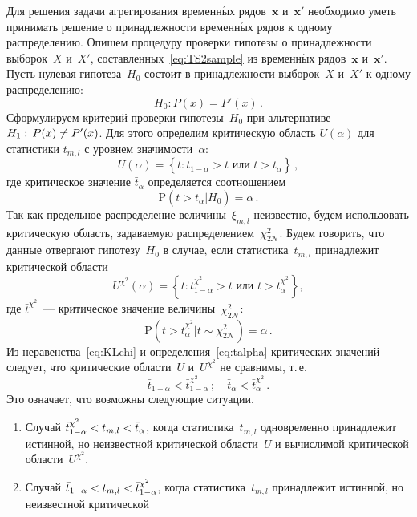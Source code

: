 \begin{multicols}{2}
Для решения задачи агрегирования временн$\acute{\mbox{ы}}$х рядов~$\mathbf{x}$ и~$\mathbf{x}'$
необходимо уметь принимать решение о принадлежности временн$\acute{\mbox{ы}}$х
рядов к одному распределению. Опишем процедуру проверки гипотезы о принадлежности
выборок~$X$ и~$X'$, составленных~\eqref{eq:TS2sample} из временн$\acute{\mbox{ы}}$х
рядов~$\mathbf{x}$ и~$\mathbf{x}'$.
Пусть нулевая гипотеза~$H_0$ состоит в принадлежности выборок~$X$ и~$X'$ к одному
распределению:
$$
H_0: P(x) = P'(x)\,.
$$
Сформулируем критерий проверки гипотезы~$H_0$ при альтернативе
$H_1:\,P(x) \hm\neq P'(x)$. Для этого определим критическую область $U(\alpha)$
для статистики $t_{m,l}$ с уровнем значимости~$\alpha$:
 $$
 U(\alpha) = \left\{t: \bar{t}_{1 -\alpha} > t \mbox{~или~} t > \bar{t}_{\alpha}\right\}\,,
 $$
 где критическое значение $\bar{t}_{\alpha}$ определяется соотношением
 \begin{equation}
 \label{eq:talpha}
 \mathrm{P}(t > \bar{t}_{\alpha}| H_0) = \alpha\,.
 \end{equation}
 Так как предельное распределение величины~$\xi_{m,l}$ неизвестно,
 будем использовать критическую область, задаваемую распределением~$\chi_{2\mathcal{N}}^2$.
 Будем говорить, что данные отвергают гипотезу~$H_0$ в случае, если
 статистика~$t_{m,l}$ принадлежит критической области
 \begin{equation}
 \label{eq:Uchi2}
U^{\chi^2}(\alpha) = \left\{
t: \bar{t}^{\chi^2}_{1 -\alpha} > t \mbox{~или~} t > \bar{t}^{\chi^2}_{\alpha}\right\},
\end{equation}
где $\bar{t}^{\chi^2}$~---  критическое значение величины~$\chi_{2\mathcal{N}}^2$:
 $$
 \mathrm{P}(t > \bar{t}^{\chi^2}_{\alpha}| t\sim\chi^2_{2\mathcal{N}}) = \alpha\,.
 $$
  Из неравенства~\eqref{eq:KLchi} и определения~\eqref{eq:talpha}
  критических значений следует, что критические области~$U$ и~$U^{\chi^2}$
  не сравнимы, т.\,е.\
 $$
 \bar{t}_{1-\alpha} < \bar{t}_{1-\alpha}^{\chi^2}\,; \quad
 \bar{t}_{\alpha} < \bar{t}_{\alpha}^{\chi^2}\,.$$
 Это означает, что возможны следующие ситуации.
 \begin{enumerate}
 \item Случай $\bar{t}_{1-\alpha}^{\chi^2} \hm< t_{m,l} \hm< \bar{t}_{\alpha}$,
 когда статистика~$t_{m,l}$ одновременно принадлежит истинной, но неизвестной
 критической области~$U$ и вычислимой критической области~$U^{\chi^2}$.
 \item Случай $\bar{t}_{1-\alpha} \hm< t_{m,l}\hm < \bar{t}_{1-\alpha}^{\chi^2}$,
 когда статистика~$t_{m,l}$ принадлежит истинной, но неизвестной критической

\end{enumerate}
\end{multicols}

